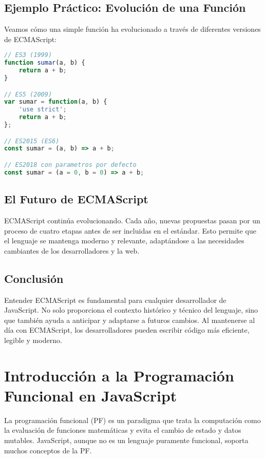 \documentclass{book}
\begin{document}
\section{Ejemplo Práctico: Evolución de una Función}

Veamos cómo una simple función ha evolucionado a través de diferentes versiones de ECMAScript:

\begin{lstlisting}[language=JavaScript]
// ES3 (1999)
function sumar(a, b) {
    return a + b;
}

// ES5 (2009)
var sumar = function(a, b) {
    'use strict';
    return a + b;
};

// ES2015 (ES6)
const sumar = (a, b) => a + b;

// ES2018 con parametros por defecto
const sumar = (a = 0, b = 0) => a + b;
\end{lstlisting}

\section{El Futuro de ECMAScript}

ECMAScript continúa evolucionando. Cada año, nuevas propuestas pasan por un proceso de cuatro etapas antes de ser incluidas en el estándar. Esto permite que el lenguaje se mantenga moderno y relevante, adaptándose a las necesidades cambiantes de los desarrolladores y la web.

\section{Conclusión}

Entender ECMAScript es fundamental para cualquier desarrollador de JavaScript. No solo proporciona el contexto histórico y técnico del lenguaje, sino que también ayuda a anticipar y adaptarse a futuros cambios. Al mantenerse al día con ECMAScript, los desarrolladores pueden escribir código más eficiente, legible y moderno.

\chapter{Introducción a la Programación Funcional en JavaScript}

La programación funcional (PF) es un paradigma que trata la computación como la evaluación de funciones matemáticas y evita el cambio de estado y datos mutables. JavaScript, aunque no es un lenguaje puramente funcional, soporta muchos conceptos de la PF.
\end{document}
